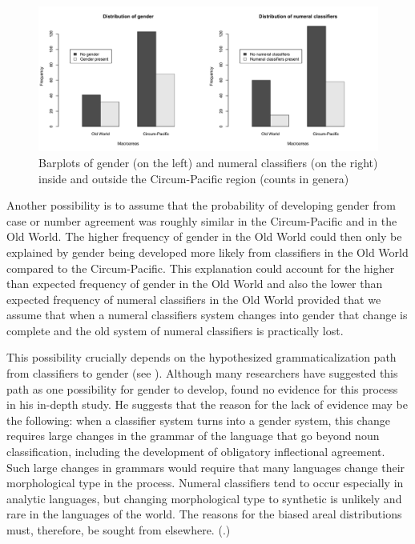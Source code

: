 \documentclass[output=collectionpaper]{langsci/langscibook}
\begin{document}
\begin{figure}
\includegraphics[width=\textwidth]{figures/13/Fig6_barplots}
\caption{Barplots of gender (on the left) and numeral classifiers (on the right) inside and outside the Circum-Pacific region (counts in genera)}
\label{fig:Sinne:6}
\end{figure}

Another possibility is to assume that the probability of developing gender from case or number agreement was roughly similar in the Circum-Pacific and in the Old World. The higher frequency of gender in the Old World could then only be explained by gender being developed more likely from classifiers in the Old World compared to the Circum-Pacific. This explanation could account for the higher than expected frequency of gender in the Old World and also the lower than expected frequency of numeral classifiers in the Old World \textendash{} provided that we assume that when a numeral classifiers system changes into gender that change is complete and the old system of numeral classifiers is practically lost.

This possibility crucially depends on the hypothesized grammaticalization path from classifiers to gender (see ). Although many researchers have suggested this path as one possibility for gender to develop, \citet[346]{Passer2016b} found no evidence for this process in his in-depth study. He suggests that the reason for the lack of evidence may be the following: when a classifier system turns into a gender system, this change requires large changes in the grammar of the language that go beyond noun classification, including the development of obligatory inflectional agreement. Such large changes in grammars would require that many languages change their morphological type in the process. Numeral classifiers tend to occur especially in analytic languages, but changing morphological type to synthetic is unlikely and rare in the languages of the world. The reasons for the biased areal distributions must, therefore, be sought from elsewhere. (\citealt{Passer2016b}.)
\end{document}
